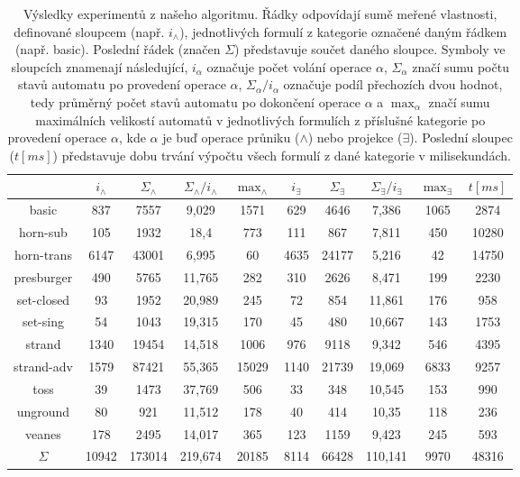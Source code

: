 \begin{table}[h]
    \centering
    \begin{tabular}{ |c||c|c|c|c||c|c|c|c||c| } 
        \hline
         & $i_{\wedge}$ & $\Sigma_{\wedge}$ & $\Sigma_{\wedge} / i_{\wedge}$ & $\max_{\wedge}$ & $i_{\exists}$ & $\Sigma_{\exists}$ & $\Sigma_{\exists} / i_{\exists}$ & $\max_{\exists}$ & $t[ms]$ \\ 
        \hline\hline
        basic & 837 & 7557 & 9,029 & 1571 & 629 & 4646 & 7,386 & 1065 & 2874 \\
        \hline
        horn-sub & 105 & 1932 & 18,4 & 773 & 111 & 867 & 7,811 & 450 & 10280 \\ 
        \hline
        horn-trans & 6147 & 43001 & 6,995 & 60 & 4635 & 24177 & 5,216 & 42 & 14750 \\
        \hline
        presburger & 490 & 5765 & 11,765 & 282 & 310 & 2626 & 8,471 & 199 & 2230 \\ 
        \hline
        set-closed & 93 & 1952 & 20,989 & 245 & 72 & 854 & 11,861 & 176 & 958 \\
        \hline
        set-sing & 54 & 1043 & 19,315 & 170 & 45 & 480 & 10,667 & 143 & 1753 \\
        \hline
        strand & 1340 & 19454 & 14,518 & 1006 & 976 & 9118 & 9,342 & 546 & 4395 \\
        \hline
        strand-adv & 1579 & 87421 & 55,365 & 15029 & 1140 & 21739 & 19,069 & 6833 & 9257 \\
        \hline
        toss & 39 & 1473 & 37,769 & 506 & 33 & 348 & 10,545 & 153 & 990 \\
        \hline
        unground & 80 & 921 & 11,512 & 178 & 40 & 414 & 10,35 & 118 & 236 \\
        \hline
        veanes & 178 & 2495 & 14,017 & 365 & 123 & 1159 & 9,423 & 245 & 593 \\ 
        \hline\hline
        $\Sigma$ & 10942 & 173014 & 219,674 & 20185 & 8114 & 66428 & 110,141 & 9970 & 48316 \\
        \hline
    \end{tabular}
    \caption{Výsledky experimentů z našeho algoritmu. Řádky odpovídají sumě meřené vlastnosti, definované sloupcem (např. $i_{\wedge}$), jednotlivých formulí z kategorie označené daným řádkem (např. basic). Poslední řádek (značen $\Sigma$) představuje součet daného sloupce. Symboly ve sloupcích znamenají následující, $i_{\alpha}$ označuje počet volání operace $\alpha$, $\Sigma_{\alpha}$ značí sumu počtu stavů automatu po provedení operace $\alpha$, $\Sigma_{\alpha} / i_{\alpha}$ označuje podíl přechozích dvou hodnot, tedy průměrný počet stavů automatu po dokončení operace $\alpha$ a $\max_{\alpha}$ značí sumu maximálních velikostí automatů v jednotlivých formulích z příslušné kategorie po provedení operace $\alpha$, kde $\alpha$ je buď operace průniku ($\wedge$) nebo projekce ($\exists$). Poslední sloupec ($t[ms]$) představuje dobu trvání výpočtu všech formulí z dané kategorie v milisekundách.}
    \label{exp1_tbl1}
\end{table}

